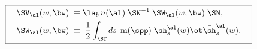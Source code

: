 \begin{equation}\label{Vfields}
\boxed{\quad
\begin{aligned}
\SV_{\al}(w,\bw)\;\equiv\;& \la_b\,n(\al)
\;\SN^{-1} \;\SW_{\al}(w,\bw) \;\SN,\\
\SW_{\al}(w,\bw)\;\equiv\;& \;\frac{1}{2}\int_{\BT}ds
\;\,{\rm m}(\spp)\;\sh_s^{\al}(w)\ot\bar{\sh}_s^{\al}(\bar{w}).
\end{aligned}\quad}
\end{equation}

